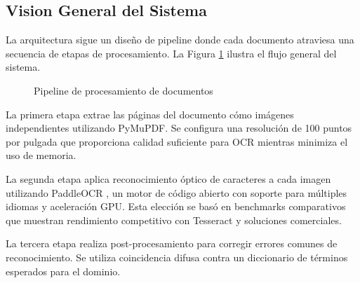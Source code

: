 \documentclass[12pt,a4paper,twoside]{book}
\begin{document}
\subsection{Vision General del Sistema}

La arquitectura sigue un diseño de pipeline donde cada documento atraviesa una secuencia de etapas de procesamiento. La Figura \ref{fig:pipeline_documentos} ilustra el flujo general del sistema.

\begin{figure}[h]
\centering
{}
\caption{Pipeline de procesamiento de documentos}
\label{fig:pipeline_documentos}
\end{figure}

La primera etapa extrae las páginas del documento cómo imágenes independientes utilizando PyMuPDF. Se configura una resolución de 100 puntos por pulgada que proporciona calidad suficiente para OCR mientras minimiza el uso de memoria.

La segunda etapa aplica reconocimiento óptico de caracteres a cada imagen utilizando PaddleOCR \cite{paddleocr2022}, un motor de código abierto con soporte para múltiples idiomas y aceleración GPU. Esta elección se basó en benchmarks comparativos que muestran rendimiento competitivo con Tesseract \cite{tesseract2007} y soluciones comerciales.

La tercera etapa realiza post-procesamiento para corregir errores comunes de reconocimiento. Se utiliza coincidencia difusa contra un diccionario de términos esperados para el dominio.
\end{document}
